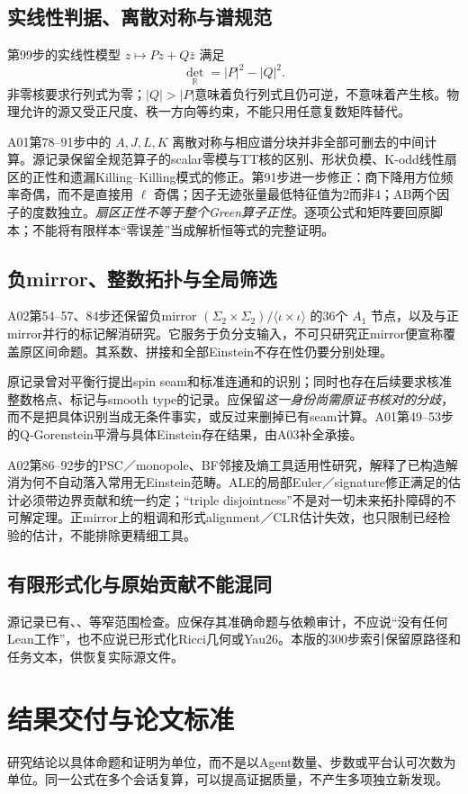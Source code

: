 \documentclass[UTF8,a4paper,11pt,fontset=fandol]{ctexart}
\numberwithin{equation}{section}
\theoremstyle{definition}
\newcommand{\R}{\mathbb R}
\begin{document}
\subsection{实线性判据、离散对称与谱规范}
第99步的实线性模型 $z\mapsto Pz+Q\bar z$ 满足
\[
\det_{\R}=|P|^2-|Q|^2.
\]
非零核要求行列式为零；$|Q|>|P|$意味着负行列式且仍可逆，不意味着产生核。物理允许的源又受正尺度、秩一方向等约束，不能只用任意复数矩阵替代。

A01第78--91步中的 $A,J,L,K$ 离散对称与相应谱分块并非全部可删去的中间计算。源记录保留全规范算子的scalar零模与TT核的区别、形状负模、K-odd线性扇区的正性和遗漏Killing--Killing模式的修正。第91步进一步修正：商下降用方位频率奇偶，而不是直接用 $\ell$ 奇偶；因子无迹张量最低特征值为2而非4；AB两个因子的度数独立。\emph{扇区正性不等于整个Green算子正性}。逐项公式和矩阵要回原脚本；不能将有限样本“零误差”当成解析恒等式的完整证明。

\subsection{负mirror、整数拓扑与全局筛选}
A02第54--57、84步还保留负mirror $(\Sigma_2\times\Sigma_2)/\langle\iota\times\iota\rangle$ 的36个 $A_1$ 节点，以及与正mirror并行的标记解消研究。它服务于负分支输入，不可只研究正mirror便宣称覆盖原区间命题。其系数、拼接和全部Einstein不存在性仍要分别处理。

原记录曾对平衡行提出spin seam和标准连通和的识别；同时也存在后续要求核准整数格点、标记与smooth type的记录。应保留\emph{这一身份尚需原证书核对的分歧}，而不是把具体识别当成无条件事实，或反过来删掉已有seam计算。A01第49--53步的Q-Gorenstein平滑与具体Einstein存在结果，由A03补全承接。

A02第86--92步的PSC／monopole、BF邻接及熵工具适用性研究，解释了已构造解消为何不自动落入常用无Einstein范畴。ALE的局部Euler／signature修正满足的估计必须带边界贡献和统一约定；“triple disjointness”不是对一切未来拓扑障碍的不可解定理。正mirror上的粗调和形式alignment／CLR估计失效，也只限制已经检验的估计，不能排除更精细工具。

\subsection{有限形式化与原始贡献不能混同}
源记录已有、、等窄范围检查。应保存其准确命题与依赖审计，不应说“没有任何Lean工作”，也不应说已形式化Ricci几何或Yau26。本版的300步索引保留原路径和任务文本，供恢复实际源文件。

\section{结果交付与论文标准}
研究结论以具体命题和证明为单位，而不是以Agent数量、步数或平台认可次数为单位。同一公式在多个会话复算，可以提高证据质量，不产生多项独立新发现。
\end{document}
